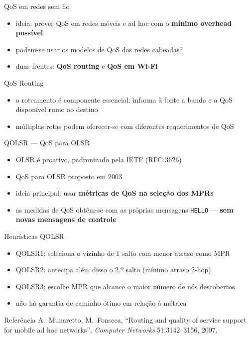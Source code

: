 \documentclass[aspectratio=169,11pt]{beamer}
\begin{document}
\begin{frame}{QoS em redes sem fio}
  \begin{itemize}
    \item ideia: prover QoS em redes móveis e ad hoc com o \textbf{mínimo overhead possível}
    \item podem-se usar os modelos de QoS das redes cabeadas?
    \item duas frentes: \textbf{QoS routing} e \textbf{QoS em Wi-Fi}
  \end{itemize}
  \pause
  \begin{block}{QoS Routing}
    \begin{itemize}
      \item o roteamento é componente essencial: informa à fonte a banda e a QoS disponível rumo ao destino
      \item múltiplas rotas podem oferecer-se com diferentes requerimentos de QoS
    \end{itemize}
  \end{block}
\end{frame}

\begin{frame}{QOLSR --- QoS para OLSR}
  \begin{itemize}
    \item OLSR é proativo, padronizado pela IETF (RFC 3626)
    \item QoS para OLSR proposto em 2003
    \item ideia principal: usar \textbf{métricas de QoS na seleção dos MPRs}
    \item as medidas de QoS obtêm-se com as próprias mensagens \texttt{HELLO} --- \textbf{sem novas mensagens de controle}
  \end{itemize}
  \begin{block}{Heurísticas QOLSR}
    \begin{itemize}
      \item QOLSR1: seleciona o vizinho de 1 salto com menor atraso como MPR
      \item QOLSR2: antecipa além disso o 2.º salto (mínimo atraso 2-hop)
      \item QOLSR3: escolhe MPR que alcance o maior número de nós descobertos
      \item não há garantia de caminho ótimo em relação à métrica
    \end{itemize}
  \end{block}
  \begin{exampleblock}{Referência}
    A.\ Munaretto, M.\ Fonseca, ``Routing and quality of service support for mobile ad hoc networks'', \emph{Computer Networks} 51:3142--3156, 2007.
  \end{exampleblock}
\end{frame}
\end{document}
